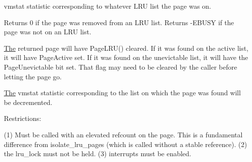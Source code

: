 vmstat statistic corresponding to whatever L\+RU list the page was on.

Returns 0 if the page was removed from an L\+RU list. Returns -\/E\+B\+U\+SY if the page was not on an L\+RU list.

\mbox{\hyperlink{classThe}{The}} returned page will have Page\+L\+R\+U() cleared. If it was found on the active list, it will have Page\+Active set. If it was found on the unevictable list, it will have the Page\+Unevictable bit set. That flag may need to be cleared by the caller before letting the page go.

\mbox{\hyperlink{classThe}{The}} vmstat statistic corresponding to the list on which the page was found will be decremented.

Restrictions\+:

(1) Must be called with an elevated refcount on the page. This is a fundamental difference from isolate\+\_\+lru\+\_\+pages (which is called without a stable reference). (2) the lru\+\_\+lock must not be held. (3) interrupts must be enabled. 